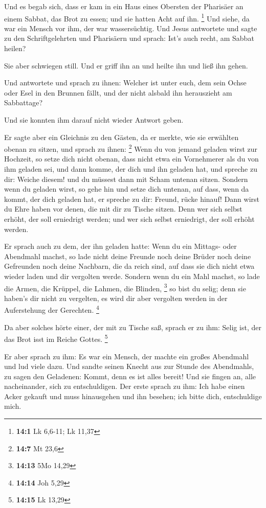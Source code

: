  Und es begab sich, dass er kam in ein Haus eines Obersten
der Pharisäer an einem Sabbat, das Brot zu essen; und sie hatten Acht
auf ihn. \footnote{\textbf{14:1} Lk 6,6-11; Lk 11,37}  Und
siehe, da war ein Mensch vor ihm, der war wassersüchtig. 
Und Jesus antwortete und sagte zu den Schriftgelehrten und Pharisäern
und sprach: Ist's auch recht, am Sabbat heilen?

 Sie aber schwiegen still. Und er griff ihn an und heilte
ihn und ließ ihn gehen.

 Und antwortete und sprach zu ihnen: Welcher ist unter euch,
dem sein Ochse oder Esel in den Brunnen fällt, und der nicht alsbald ihn
herauszieht am Sabbattage?

 Und sie konnten ihm darauf nicht wieder Antwort geben.

 Er sagte aber ein Gleichnis zu den Gästen, da er merkte,
wie sie erwählten obenan zu sitzen, und sprach zu ihnen: \footnote{\textbf{14:7}
  Mt 23,6}  Wenn du von jemand geladen wirst zur Hochzeit,
so setze dich nicht obenan, dass nicht etwa ein Vornehmerer als du von
ihm geladen sei,  und dann komme, der dich und ihn geladen
hat, und spreche zu dir: Weiche diesem! und du müssest dann mit Scham
untenan sitzen.  Sondern wenn du geladen wirst, so gehe hin
und setze dich untenan, auf dass, wenn da kommt, der dich geladen hat,
er spreche zu dir: Freund, rücke hinauf! Dann wirst du Ehre haben vor
denen, die mit dir zu Tische sitzen.  Denn wer sich selbst
erhöht, der soll erniedrigt werden; und wer sich selbst erniedrigt, der
soll erhöht werden.

 Er sprach auch zu dem, der ihn geladen hatte: Wenn du ein
Mittags- oder Abendmahl machst, so lade nicht deine Freunde noch deine
Brüder noch deine Gefreunden noch deine Nachbarn, die da reich sind, auf
dass sie dich nicht etwa wieder laden und dir vergolten werde.
 Sondern wenn du ein Mahl machst, so lade die Armen, die
Krüppel, die Lahmen, die Blinden, \footnote{\textbf{14:13} 5Mo 14,29}
 so bist du selig; denn sie haben's dir nicht zu vergelten,
es wird dir aber vergolten werden in der Auferstehung der Gerechten.
\footnote{\textbf{14:14} Joh 5,29}

 Da aber solches hörte einer, der mit zu Tische saß, sprach
er zu ihm: Selig ist, der das Brot isst im Reiche Gottes. \footnote{\textbf{14:15}
  Lk 13,29}

 Er aber sprach zu ihm: Es war ein Mensch, der machte ein
großes Abendmahl und lud viele dazu.  Und sandte seinen
Knecht aus zur Stunde des Abendmahls, zu sagen den Geladenen: Kommt,
denn es ist alles bereit!  Und sie fingen an, alle
nacheinander, sich zu entschuldigen. Der erste sprach zu ihm: Ich habe
einen Acker gekauft und muss hinausgehen und ihn besehen; ich bitte
dich, entschuldige mich.

